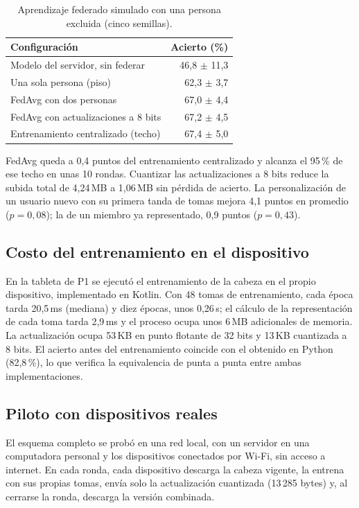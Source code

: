 \begin{table}[h]
    \centering
    \begin{tabular}{lr}
        \toprule
        Configuración & Acierto (\%) \\
        \midrule
        Modelo del servidor, sin federar & 46,8 $\pm$ 11,3 \\
        Una sola persona (piso) & 62,3 $\pm$ 3,7 \\
        FedAvg con dos personas & 67,0 $\pm$ 4,4 \\
        FedAvg con actualizaciones a 8 bits & 67,2 $\pm$ 4,5 \\
        Entrenamiento centralizado (techo) & 67,4 $\pm$ 5,0 \\
        \bottomrule
    \end{tabular}
    \caption{Aprendizaje federado simulado con una persona excluida (cinco semillas).}
    \label{tab:federado-simulado}
\end{table}

FedAvg queda a 0,4 puntos del entrenamiento centralizado y alcanza el 95\,\% de ese techo en unas 10 rondas. Cuantizar las actualizaciones a 8 bits reduce la subida total de 4,24\,MB a 1,06\,MB sin pérdida de acierto. La personalización de un usuario nuevo con su primera tanda de tomas mejora 4,1 puntos en promedio ($p = 0{,}08$); la de un miembro ya representado, 0,9 puntos ($p = 0{,}43$).

\subsection{Costo del entrenamiento en el dispositivo}

En la tableta de P1 se ejecutó el entrenamiento de la cabeza en el propio dispositivo, implementado en Kotlin. Con 48 tomas de entrenamiento, cada época tarda 20,5\,ms (mediana) y diez épocas, unos 0,26\,s; el cálculo de la representación de cada toma tarda 2,9\,ms y el proceso ocupa unos 6\,MB adicionales de memoria. La actualización ocupa 53\,KB en punto flotante de 32 bits y 13\,KB cuantizada a 8 bits. El acierto antes del entrenamiento coincide con el obtenido en Python (82,8\,\%), lo que verifica la equivalencia de punta a punta entre ambas implementaciones.

\subsection{Piloto con dispositivos reales}

El esquema completo se probó en una red local, con un servidor en una computadora personal y los dispositivos conectados por Wi-Fi, sin acceso a internet. En cada ronda, cada dispositivo descarga la cabeza vigente, la entrena con sus propias tomas, envía solo la actualización cuantizada (13\,285 bytes) y, al cerrarse la ronda, descarga la versión combinada.

